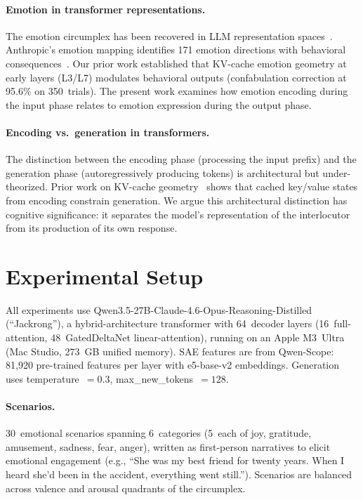 \documentclass[11pt,a4paper]{article}
\begin{document}
\paragraph{Emotion in transformer representations.}
The emotion circumplex has been recovered in LLM representation
spaces~\citep{sun2026circumplex, choi2026circumplex}. Anthropic's emotion
mapping identifies 171 emotion directions with behavioral
consequences~\citep{anthropic2026emotion}. Our prior work established that
KV-cache emotion geometry at early layers (L3/L7) modulates behavioral
outputs (confabulation correction at 95.6\% on 350~trials). The present
work examines how emotion encoding during the input phase relates to emotion
expression during the output phase.

\paragraph{Encoding vs.\ generation in transformers.}
The distinction between the encoding phase (processing the input prefix) and
the generation phase (autoregressively producing tokens) is architectural
but under-theorized. Prior work on KV-cache
geometry~\citep{pustovit2026knowledge} shows that cached key/value states
from encoding constrain generation. We argue this architectural distinction
has cognitive significance: it separates the model's representation of the
interlocutor from its production of its own response.

\section{Experimental Setup}
\label{sec:setup}

All experiments use Qwen3.5-27B-Claude-4.6-Opus-Reasoning-Distilled
(``Jackrong''), a hybrid-architecture transformer with 64~decoder layers
(16~full-attention, 48~GatedDeltaNet linear-attention), running on an Apple
M3~Ultra (Mac Studio, 273~GB unified memory). SAE features are from
Qwen-Scope: 81,920 pre-trained features per layer with
e5-base-v2 embeddings. Generation uses temperature~$= 0.3$,
max\_new\_tokens~$= 128$.

\paragraph{Scenarios.} 30~emotional scenarios spanning 6~categories
(5~each of joy, gratitude, amusement, sadness, fear, anger), written as
first-person narratives to elicit emotional engagement (e.g., ``She was my
best friend for twenty years. When I heard she'd been in the accident,
everything went still.''). Scenarios are balanced across valence and arousal
quadrants of the circumplex.
\end{document}

